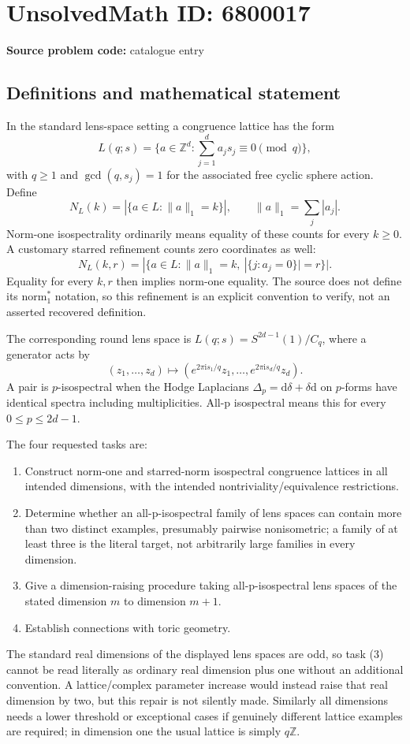 \documentclass[11pt]{article}
\newcommand{\Z}{\mathbb{Z}}
\begin{document}
\section*{UnsolvedMath ID: 6800017}
\textbf{Source problem code:} catalogue entry
\subsection{Definitions and mathematical statement}
In the standard lens-space setting a congruence lattice has the form
\[
L(q;s)=\{a\in\Z^d:\textstyle\sum_{j=1}^d a_js_j\equiv0\pmod q\},
\]
with \(q\ge1\) and \(\gcd(q,s_j)=1\) for the associated free cyclic sphere action. Define
\[
N_L(k)=|\{a\in L:\|a\|_1=k\}|,\qquad
\|a\|_1=\sum_j|a_j|.
\]
Norm-one isospectrality ordinarily means equality of these counts for every \(k\ge0\). A customary starred refinement counts zero coordinates as well:
\[
N_L(k,r)=|\{a\in L:\|a\|_1=k,\ |\{j:a_j=0\}|=r\}|.
\]
Equality for every \(k,r\) then implies norm-one equality. The source does not define its \(\mathrm{norm}_1^*\) notation, so this refinement is an explicit convention to verify, not an asserted recovered definition.

The corresponding round lens space is \(L(q;s)=S^{2d-1}(1)/C_q\), where a generator acts by
\[
(z_1,\ldots,z_d)\longmapsto
(e^{2\pi\mathrm i s_1/q}z_1,\ldots,e^{2\pi\mathrm i s_d/q}z_d).
\]
A pair is \(p\)-isospectral when the Hodge Laplacians \(\Delta_p=\mathrm d\delta+\delta\mathrm d\) on \(p\)-forms have identical spectra including multiplicities. All-p isospectral means this for every \(0\le p\le2d-1\).

The four requested tasks are:
\begin{enumerate}
\item Construct norm-one and starred-norm isospectral congruence lattices in all intended dimensions, with the intended nontriviality/equivalence restrictions.
\item Determine whether an all-p-isospectral family of lens spaces can contain more than two distinct examples, presumably pairwise nonisometric; a family of at least three is the literal target, not arbitrarily large families in every dimension.
\item Give a dimension-raising procedure taking all-p-isospectral lens spaces of the stated dimension \(m\) to dimension \(m+1\).
\item Establish connections with toric geometry.
\end{enumerate}
The standard real dimensions of the displayed lens spaces are odd, so task (3) cannot be read literally as ordinary real dimension plus one without an additional convention. A lattice/complex parameter increase would instead raise that real dimension by two, but this repair is not silently made. Similarly all dimensions needs a lower threshold or exceptional cases if genuinely different lattice examples are required; in dimension one the usual lattice is simply \(q\Z\).
\end{document}
